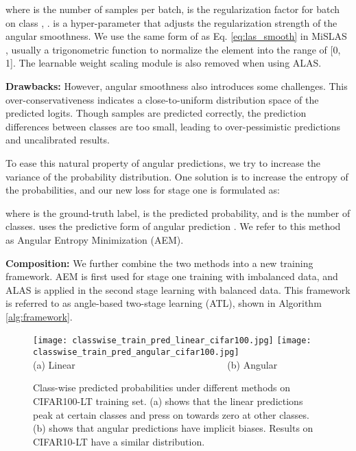 \documentclass[10pt,twocolumn,letterpaper]{article}
\begin{document}
where  is the number of samples per batch,  is the regularization factor for batch  on class , .  is a hyper-parameter that adjusts the regularization strength of the angular smoothness. We use the same form of  as Eq. \ref{eq:las_smooth} in MiSLAS \cite{mislas}, usually a trigonometric function to normalize the element into the range of [0, 1]. The learnable weight scaling module is also removed when using ALAS. 


\textbf{Drawbacks:} However, angular smoothness also introduces some challenges. This over-conservativeness indicates a close-to-uniform distribution space of the predicted logits. Though samples are predicted correctly, the prediction differences between classes are too small, leading to over-pessimistic predictions and uncalibrated results. 

To ease this natural property of angular predictions, we try to increase the variance of the probability distribution. One solution is to increase the entropy of the probabilities, and our new loss for stage one is formulated as:

where  is the ground-truth label,  is the predicted probability, and  is the number of classes.  uses the predictive form of angular prediction . We refer to this method as Angular Entropy Minimization (AEM).

\textbf{Composition:} We further combine the two methods into a new training framework. AEM is first used for stage one training with imbalanced data, and ALAS is applied in the second stage learning with balanced data. This framework is referred to as angle-based two-stage learning (ATL), shown in Algorithm \ref{alg:framework}.

\begin{figure}[t]
  \centering
   \texttt{[image: classwise\_train\_pred\_linear\_cifar100.jpg]}
   \texttt{[image: classwise\_train\_pred\_angular\_cifar100.jpg]}\\
   (a) Linear  \ \ \ \ \ \ \ \ \ \ \ \ \ \ \ \ \ \ \ \ \ \ \ \ \ \ \ \ \ \ \  (b) Angular
   \vspace{-5pt}
   \caption{Class-wise predicted probabilities under different methods on CIFAR100-LT training set. (a) shows that the linear predictions peak at certain classes and press on towards zero at other classes. (b) shows that angular predictions have implicit biases. Results on CIFAR10-LT have a similar distribution.}
   \label{fig:implicit_bias}
\end{figure}
\end{document}
